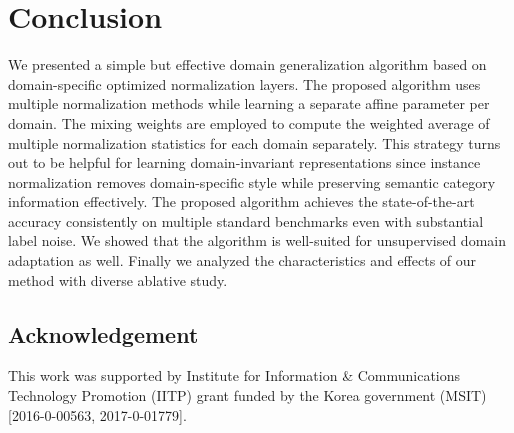 \documentclass[runningheads]{llncs}
\begin{document}
 

\section{Conclusion}
\label{sec:conclusion}

We presented a simple but effective domain generalization algorithm based on domain-specific optimized normalization layers.
The proposed algorithm uses multiple normalization methods while learning a separate affine parameter per domain.
The mixing weights are employed to compute the weighted average of multiple normalization statistics for each domain separately.
This strategy turns out to be helpful for learning domain-invariant representations since instance normalization removes domain-specific style while preserving semantic category information effectively.
The proposed algorithm achieves the state-of-the-art accuracy consistently on multiple standard benchmarks even with substantial label noise.
We showed that the algorithm is well-suited for unsupervised domain adaptation as well.
Finally we analyzed the characteristics and effects of our method with diverse ablative study.


\subsection*{Acknowledgement}

This work was supported by Institute for Information \&
Communications Technology Promotion (IITP) grant funded by the Korea government (MSIT) [2016-0-00563, 2017-0-01779]. 


\end{document}
